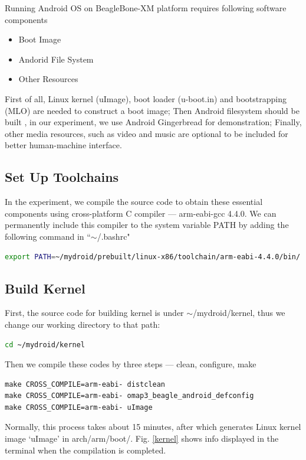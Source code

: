 \documentclass[10pt,journal,draftclsnofoot,onecolumn]{IEEEtran}
\begin{document}
Running Android OS on BeagleBone-XM platform requires following software components
\begin{itemize}
\item Boot Image
\item Andorid File System
\item Other Resources
\end{itemize}

First of all, Linux kernel (uImage), boot loader (u-boot.in) and bootstrapping (MLO)  are needed to construct a boot image; Then Android filesystem should be built , in our experiment, we use Android Gingerbread for demonstration; Finally, other media resources, such as video and music are optional to be included for better human-machine interface. 

\subsection{Set Up Toolchains}
In the experiment, we compile the source code to obtain these essential components using cross-platform C compiler --- arm-eabi-gcc 4.4.0.
We can permanently include this compiler to the system variable PATH by adding the following command in ``$\sim$/.bashrc"

\begin{lstlisting}[language={bash}]
export PATH=~/mydroid/prebuilt/linux-x86/toolchain/arm-eabi-4.4.0/bin/:$PATH
\end{lstlisting}

\subsection{Build Kernel}
First, the source code for building kernel is under $\sim$/mydroid/kernel, thus we change our working directory to that path:

\begin{lstlisting}[language={bash}]
cd ~/mydroid/kernel
\end{lstlisting}

Then we compile these codes by three steps --- clean, configure, make
\begin{lstlisting}[language={make}]
make CROSS_COMPILE=arm-eabi- distclean
make CROSS_COMPILE=arm-eabi- omap3_beagle_android_defconfig
make CROSS_COMPILE=arm-eabi- uImage
\end{lstlisting}

Normally, this process takes about 15 minutes, after which generates  Linux kernel image `uImage' in arch/arm/boot/. Fig. \ref{kernel}  shows  info displayed in the terminal when the compilation is completed.
\end{document}

